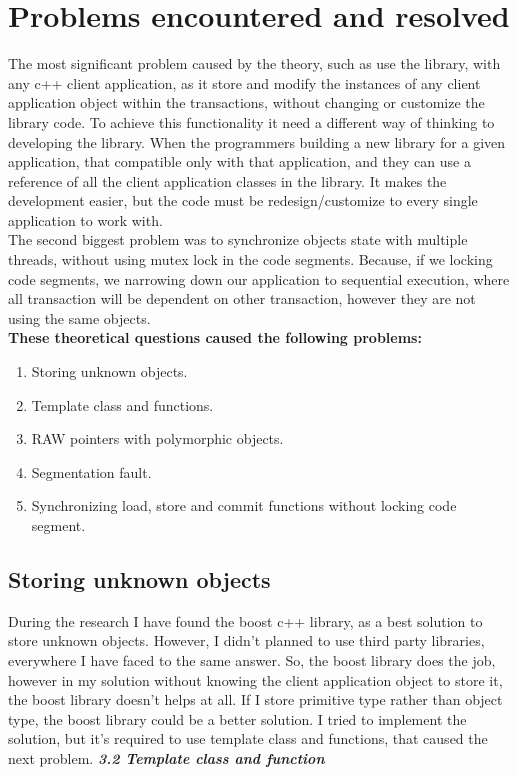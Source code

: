 \documentclass[12pt]{article}
\begin{document}
\section{Problems encountered and resolved}
The most significant problem caused by the theory, such as use the library, with any c++ client application, as it store and modify the instances of any client application object within the transactions, without changing or customize the library code. To achieve this functionality it need a different way of thinking to developing the library. When the programmers building a new library for a given application, that compatible only with that application, and they can use a reference of all the client application classes in the library. It makes the development easier, but the code must be redesign/customize to every single application to work with.\\

The second biggest problem was to synchronize objects state with multiple threads, without using mutex lock in the code segments. Because, if we locking code segments, we narrowing down our application to sequential execution, where all transaction will be dependent on other transaction, however they are not using the same objects.\\

\textbf{These theoretical questions caused the following problems:}
\begin{enumerate}
\item Storing unknown objects. 
\item Template class and functions.
\item RAW pointers with polymorphic objects.
\item Segmentation fault.
\item Synchronizing load, store and commit functions without locking code segment.
\end{enumerate}
 
\subsection{Storing unknown objects}
During the research I have found the boost c++ library, as a best solution to store unknown objects. However, I didn't planned to use third party libraries, everywhere I have faced to the same answer. So, the boost library does the job, however in my solution without knowing the client application object to store it, the boost library doesn't helps at all. If I store primitive type rather than object type, the boost library could be a better solution. I tried to implement the solution, but it's required to use template class and functions, that caused the next problem. \textbf{\textit{3.2 Template class and function}}
\end{document}
